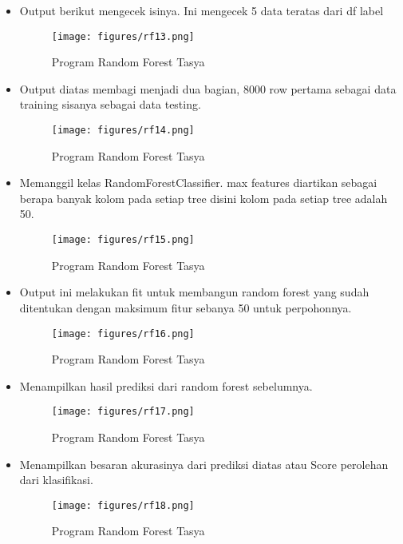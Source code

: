 \begin{itemize}
\begin{figure}[ht]
\label{Praktek}
\end{figure}
\item Output berikut mengecek isinya. Ini mengecek 5 data teratas dari df label
\begin{figure}[ht]
\centering
\texttt{[image: figures/rf13.png]}
\caption{Program Random Forest Tasya}
\label{Praktek}
\end{figure}
\item Output diatas membagi menjadi dua bagian, 8000 row pertama sebagai data training sisanya sebagai data testing.
\begin{figure}[ht]
\centering
\texttt{[image: figures/rf14.png]}
\caption{Program Random Forest Tasya}
\label{Praktek}
\end{figure}
\item Memanggil kelas RandomForestClassifier. max features diartikan sebagai berapa banyak kolom pada setiap tree disini kolom pada setiap tree adalah 50.
\begin{figure}[ht]
\centering
\texttt{[image: figures/rf15.png]}
\caption{Program Random Forest Tasya}
\label{Praktek}
\end{figure}
\item Output ini melakukan fit untuk membangun random forest yang sudah ditentukan dengan maksimum fitur sebanya 50 untuk perpohonnya.
\begin{figure}[ht]
\centering
\texttt{[image: figures/rf16.png]}
\caption{Program Random Forest Tasya}
\label{Praktek}
\end{figure}
\item Menampilkan hasil prediksi dari random forest sebelumnya.
\begin{figure}[ht]
\centering
\texttt{[image: figures/rf17.png]}
\caption{Program Random Forest Tasya}
\label{Praktek}
\end{figure}
\item Menampilkan besaran akurasinya dari prediksi diatas atau Score perolehan dari klasifikasi.
\begin{figure}[ht]
\centering
\texttt{[image: figures/rf18.png]}
\caption{Program Random Forest Tasya}
\label{Praktek}
\end{figure}
\end{itemize}

